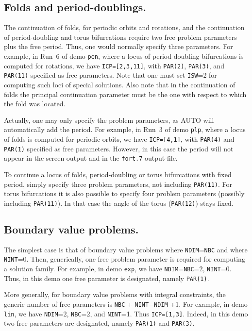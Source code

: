 \documentclass[12pt]{report}
\begin{document}
\subsection{ Folds and period-doublings.}
The continuation of folds, for periodic orbits and rotations,
and the continuation of period-doubling and torus bifurcations require two free 
problem parameters plus the free period. Thus, one would normally
specify three parameters.
For example, in Run~6 of demo {\tt pen}, where a locus of period-doubling
bifurcations is computed for rotations, we have {\tt ICP=[2,3,11]}, 
with {\tt PAR(2)}, {\tt PAR(3)}, and {\tt PAR(11)} specified as free parameters. 
Note that one must set {\tt ISW}=2 for computing such loci of special solutions.
Also note that in the continuation of folds the principal continuation parameter
must be the one with respect to which the fold was located.

Actually, one may only specify the problem parameters,
as {\cal AUTO} will automatically add the period.
For example, in Run~3 of demo {\tt plp}, where a locus of folds is computed 
for periodic orbits, we have {\tt ICP=[4,1]}, with {\tt PAR(4)} and {\tt PAR(1)} specified
as free parameters. 
However, in this case the period will not appear in the screen output 
and in the {\tt fort.7} output-file. 

To continue a locus of folds, period-doubling or torus bifurcations
with fixed period, simply
specify three problem parameters, not including {\tt PAR(11)}.
For torus bifurcations it is also possible to specify
four problem parameters (possibly including {\tt PAR(11)}). In that
case the angle of the torus ({\tt PAR(12)}) stays fixed.

\subsection{ Boundary value problems.}
The simplest case is that of boundary value problems where 
{\tt NDIM}={\tt NBC} 
and where {\tt NINT}=0.
Then, generically, one free problem parameter is required for computing 
a solution family.
For example, in demo {\tt exp}, we have {\tt NDIM}={\tt NBC}=2, {\tt NINT}=0. 
Thus, in this demo one free parameter is designated,
namely {\tt PAR(1)}.

More generally, for boundary value problems with integral constraints,
the generic number of free parameters is {\tt NBC} + {\tt NINT}$-${\tt NDIM} +1.
For example, in demo {\tt lin}, we have {\tt NDIM}=2, {\tt NBC}=2, and {\tt NINT}=1.
Thus {\tt ICP=[1,3]}. 
Indeed, in this demo two free parameters are designated,
namely {\tt PAR(1)} and {\tt PAR(3)}.
\end{document}
